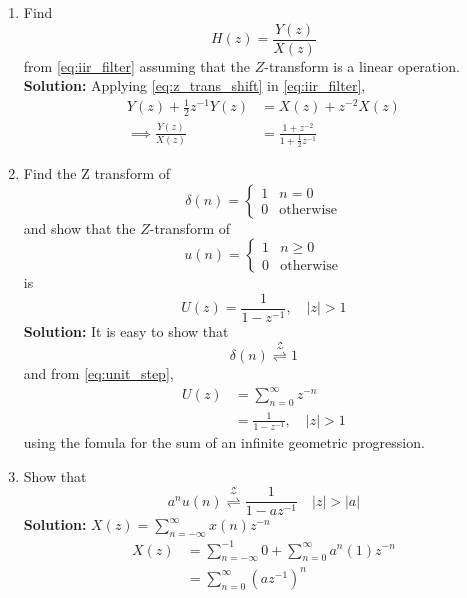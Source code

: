 \documentclass[journal,12pt,twocolumn]{IEEEtran}
\renewcommand\thesection{\arabic{section}}
\newcommand{\solution}{\noindent \textbf{Solution: }}
\providecommand{\abs}[1]{\left\vert#1\right\vert}
\providecommand{\ztrans}{\overset{\mathcal{Z}}{ \rightleftharpoons}}
\numberwithin{equation}{section}
\renewcommand\thesection{\arabic{section}}
\begin{document}
\begin{enumerate}[label=\thesection.\arabic*]
\item Find
%
\begin{equation}
H(z) = \frac{Y(z)}{X(z)}
\end{equation}
%
from  \eqref{eq:iir_filter} assuming that the $Z$-transform is a linear operation.
\\
\solution  Applying \eqref{eq:z_trans_shift} in \eqref{eq:iir_filter},
\begin{align}
Y(z) + \frac{1}{2}z^{-1}Y(z) &= X(z)+z^{-2}X(z)
\\
\implies \frac{Y(z)}{X(z)} &= \frac{1 + z^{-2}}{1 + \frac{1}{2}z^{-1}}
\label{eq:freq_resp}
\end{align}
%
\item Find the Z transform of 
\begin{equation}
\delta(n)
=
\begin{cases}
1 & n = 0
\\
0 & \text{otherwise}
\end{cases}
\end{equation}
and show that the $Z$-transform of
\begin{equation}
\label{eq:unit_step}
u(n)
=
\begin{cases}
1 & n \ge 0
\\
0 & \text{otherwise}
\end{cases}
\end{equation}
is
\begin{equation}
U(z) = \frac{1}{1-z^{-1}}, \quad \abs{z} > 1
\end{equation}
\solution It is easy to show that
\begin{equation}
\delta(n) \ztrans 1
\end{equation}
and from \eqref{eq:unit_step},
\begin{align}
U(z) &= \sum _{n= 0}^{\infty}z^{-n}
\\
&=\frac{1}{1-z^{-1}}, \quad \abs{z} > 1
\end{align}
using the fomula for the sum of an infinite geometric progression.
%
\item Show that 
\begin{equation}
\label{eq:anun}
a^nu(n) \ztrans \frac{1}{1-az^{-1}} \quad \abs{z} > \abs{a}
\end{equation}
\solution$X(z) = \sum_{n=-\infty}^{\infty}x(n)z^{-n}$
\begin{align*}
X(z) &= \sum_{n=-\infty}^{-1}0 + \sum_{n=0}^{\infty}a^{n}(1)z^{-n} \\
     &= \sum_{n=0}^{\infty} (az^{-1})^{n} \\

\end{align*}
\end{enumerate}
\end{document}
